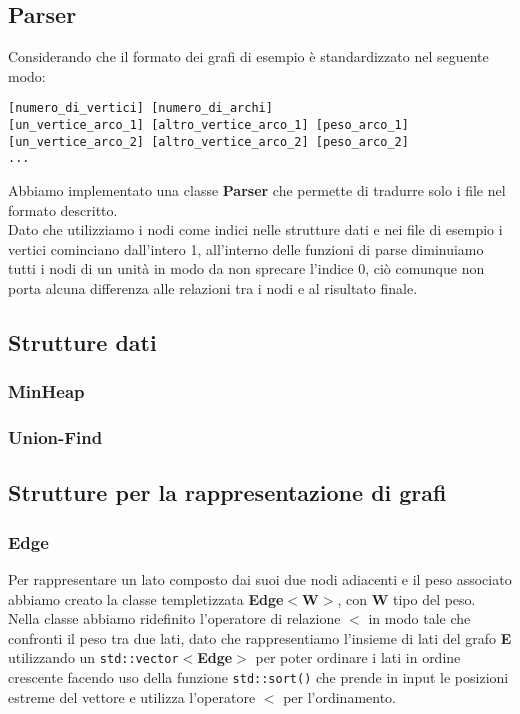 \documentclass[]{article}
\begin{document}
\subsection{Parser}
Considerando che il formato dei grafi di esempio è standardizzato nel seguente modo:
\begin{verbatim}
[numero_di_vertici] [numero_di_archi] 
[un_vertice_arco_1] [altro_vertice_arco_1] [peso_arco_1] 
[un_vertice_arco_2] [altro_vertice_arco_2] [peso_arco_2] 
...
\end{verbatim}
Abbiamo implementato una classe \textbf{Parser} che permette di tradurre solo i file nel formato descritto.\\
Dato che utilizziamo i nodi come indici nelle strutture dati e nei file di esempio i vertici cominciano dall'intero 1, all'interno delle funzioni di parse diminuiamo tutti i nodi di un unità in modo da non sprecare l'indice 0, ciò comunque non porta alcuna differenza alle relazioni tra i nodi e al risultato finale.
\subsection{Strutture dati}
\subsubsection{MinHeap}
\subsubsection{Union-Find}
\subsection{Strutture per la rappresentazione di grafi}
\subsubsection{Edge}
Per rappresentare un lato composto dai  suoi due nodi adiacenti e il peso associato abbiamo creato la classe templetizzata \textbf{Edge$<$W$>$}, con
\textbf{W} tipo del peso.\\
Nella classe abbiamo ridefinito l'operatore di relazione \textbf{$<$} in modo tale che confronti il peso tra due lati, dato che rappresentiamo l'insieme di lati del grafo \textbf{E} utilizzando un \verb|std::vector|$<$\textbf{Edge}$>$ per poter ordinare i lati in ordine crescente facendo uso della funzione \verb|std::sort()| che prende in input le posizioni estreme del vettore e utilizza l'operatore \textbf{$<$} per l'ordinamento.
\end{document}
